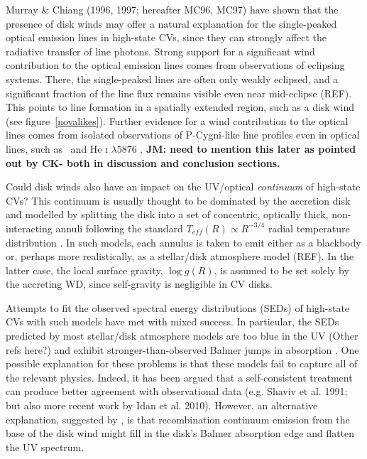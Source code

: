 \documentclass[preprint, a4paper, 11pt]{aastex}
\begin{document}
Murray \& Chiang (1996, 1997; hereafter MC96, MC97)\nocite{MC96, MC97} 
have shown that the presence of disk winds may
offer a natural explanation for the single-peaked optical emission lines in
high-state CVs, since they can strongly affect the radiative transfer
of line photons. Strong support for a significant wind contribution to the
optical emission lines comes from observations of eclipsing
systems. There, the single-peaked lines are often only weakly
eclipsed, and a significant fraction of the line flux remains visible
even near mid-eclipse (REF). This points to line formation in a spatially
extended region, such as a disk wind (see figure~\ref{novalikes}).
Further evidence for a wind contribution to the optical lines comes
from isolated observations of P-Cygni-like line profiles even in optical
lines, such as \ha\ and He \textsc{i} $\lambda5876$ \citep{RN98, kafka2004}.
{\bf JM: need to mention this later as pointed out by CK- both in discussion
and conclusion sections.}

Could disk winds also have an impact on the UV/optical {\em continuum}
of high-state CVs? This continuum is usually thought to be dominated
by the accretion disk and modelled by splitting the disk into
a set of concentric, optically thick, non-interacting annuli following
the standard $T_{eff}(R) \propto R^{-3/4}$ radial temperature
distribution \citep{shakurasunyaev1973}. In such
models, each annulus is taken to emit either as a blackbody or,
perhaps more realistically, as a stellar/disk atmosphere model
(REF). In the latter case, the local surface gravity, $\log{g}(R)$, is
assumed to be set solely by the accreting WD, since self-gravity is
negligible in CV disks.


Attempts to fit the observed spectral energy distributions (SEDs) of
high-state CVs with such models have met with mixed success. In
particular, the SEDs predicted by most stellar/disk atmosphere models 
are too blue in the UV \citep{wade1988,long1991,long1994}(Other refs here?) and exhibit
stronger-than-observed Balmer jumps in absorption 
\citep{wade1984,haug1987,ladous1989b,knigge1998}. One possible
explanation for these problems is that these models fail to capture
all of the relevant physics. Indeed, it has been argued that a
self-consistent treatment can 
produce better agreement with observational data (e.g. Shaviv et
al. 1991;  but also more recent work by Idan et al. 2010).
\nocite{idanshaviv2010} \nocite{shaviv1991}
However, an alternative explanation, suggested by \cite{KLWB98}, 
is that recombination continuum emission from the base of the 
disk wind might fill in the disk's
Balmer absorption edge and flatten the UV spectrum. 
\end{document}

